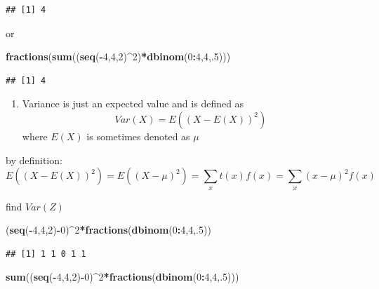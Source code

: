 \documentclass[]{book}
\newenvironment{Shaded}{\begin{snugshade}}{\end{snugshade}}
\newcommand{\KeywordTok}[1]{\textcolor[rgb]{0.13,0.29,0.53}{\textbf{#1}}}
\newcommand{\DecValTok}[1]{\textcolor[rgb]{0.00,0.00,0.81}{#1}}
\newcommand{\OperatorTok}[1]{\textcolor[rgb]{0.81,0.36,0.00}{\textbf{#1}}}
\newcommand{\NormalTok}[1]{#1}
\providecommand{\tightlist}{%
  \setlength{\itemsep}{0pt}\setlength{\parskip}{0pt}}
\theoremstyle{definition}
\theoremstyle{definition}
\theoremstyle{definition}
\theoremstyle{remark}
\begin{document}
\begin{verbatim}
## [1] 4
\end{verbatim}

or

\begin{Shaded}
\begin{Highlighting}[]
\KeywordTok{fractions}\NormalTok{(}\KeywordTok{sum}\NormalTok{((}\KeywordTok{seq}\NormalTok{(}\OperatorTok{-}\DecValTok{4}\NormalTok{,}\DecValTok{4}\NormalTok{,}\DecValTok{2}\NormalTok{)}\OperatorTok{^}\DecValTok{2}\NormalTok{)}\OperatorTok{*}\KeywordTok{dbinom}\NormalTok{(}\DecValTok{0}\OperatorTok{:}\DecValTok{4}\NormalTok{,}\DecValTok{4}\NormalTok{,.}\DecValTok{5}\NormalTok{)))}
\end{Highlighting}
\end{Shaded}

\begin{verbatim}
## [1] 4
\end{verbatim}

\begin{enumerate}
\def\labelenumi{\arabic{enumi}.}
\setcounter{enumi}{3}
\tightlist
\item
  Variance is just an expected value and is defined as
  \[Var(X)=E((X-E(X))^2)\] where \(E(X)\) is sometimes denoted as
  \(\mu\)
\end{enumerate}

by definition:
\[E((X-E(X))^2)=E((X-\mu)^2)=\sum_{x}t(x)f(x)=\sum_{x}(x-\mu)^2f(x)\]

find \(Var(Z)\)

\begin{Shaded}
\begin{Highlighting}[]
\NormalTok{(}\KeywordTok{seq}\NormalTok{(}\OperatorTok{-}\DecValTok{4}\NormalTok{,}\DecValTok{4}\NormalTok{,}\DecValTok{2}\NormalTok{)}\OperatorTok{-}\DecValTok{0}\NormalTok{)}\OperatorTok{^}\DecValTok{2}\OperatorTok{*}\KeywordTok{fractions}\NormalTok{(}\KeywordTok{dbinom}\NormalTok{(}\DecValTok{0}\OperatorTok{:}\DecValTok{4}\NormalTok{,}\DecValTok{4}\NormalTok{,.}\DecValTok{5}\NormalTok{))}
\end{Highlighting}
\end{Shaded}

\begin{verbatim}
## [1] 1 1 0 1 1
\end{verbatim}

\begin{Shaded}
\begin{Highlighting}[]
\KeywordTok{sum}\NormalTok{((}\KeywordTok{seq}\NormalTok{(}\OperatorTok{-}\DecValTok{4}\NormalTok{,}\DecValTok{4}\NormalTok{,}\DecValTok{2}\NormalTok{)}\OperatorTok{-}\DecValTok{0}\NormalTok{)}\OperatorTok{^}\DecValTok{2}\OperatorTok{*}\KeywordTok{fractions}\NormalTok{(}\KeywordTok{dbinom}\NormalTok{(}\DecValTok{0}\OperatorTok{:}\DecValTok{4}\NormalTok{,}\DecValTok{4}\NormalTok{,.}\DecValTok{5}\NormalTok{)))}
\end{Highlighting}
\end{Shaded}
\end{document}
